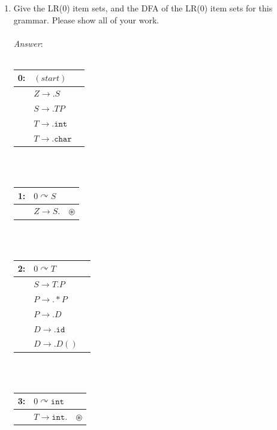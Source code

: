 \documentclass[fleqn]{article}
\begin{document}
\begin{enumerate}
  \item Give the LR(0) item sets, and the DFA of the LR(0) item sets for this
  grammar. Please show all of your work.\\\\
  \textit{Answer}:\\\\
  \begin{tabular}{| l   l  c |}
  \hline
  0: & $(start)$                      & \\
  \hline
  \hline
     & $Z \rightarrow .S$             & \\
     & $S \rightarrow .TP$            & \\
     & $T \rightarrow .\texttt{int}$  & \\
     & $T \rightarrow .\texttt{char}$ & \\
  \hline
  \end{tabular}\\\\

  \begin{tabular}{| l   l   c |}
  \hline
  1: & $0 \curvearrowright S$ &               \\
  \hline
  \hline
     & $Z \rightarrow S.$     & $\circledast$ \\
  \hline
  \end{tabular}\\\\

  \begin{tabular}{| l   l  c |}
  \hline
  2: & $0 \curvearrowright T$           & \\
  \hline
  \hline
     & $S \rightarrow T.P$             & \\
     & $P \rightarrow .*P$             & \\
     & $P \rightarrow .D$              & \\
     & $D \rightarrow .\texttt{id}$    & \\
     & $D \rightarrow .D()$            & \\
  \hline
  \end{tabular}\\\\

  \begin{tabular}{| l   l  c |}
  \hline
  3: & $0 \curvearrowright \texttt{int}$ &               \\
  \hline
  \hline
     & $T \rightarrow \texttt{int}.$     & $\circledast$ \\
  \hline
  \end{tabular}\\\\


\end{enumerate}
\end{document}
